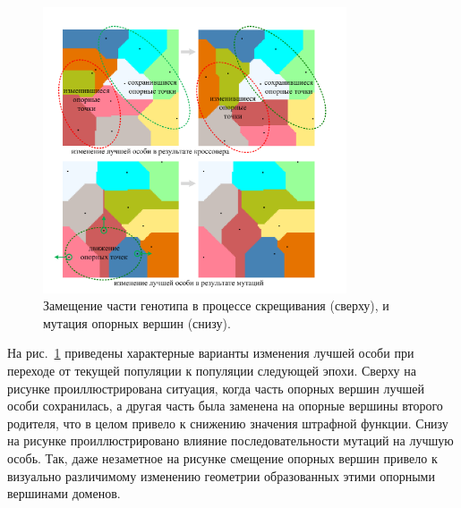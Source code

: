 \begin{figure}[ht]
\centering
\includegraphics[width=0.8\textwidth]{fig/par_gen_changes.pdf}
\singlespacing
{}\caption{Замещение части генотипа в процессе скрещивания (сверху), и мутация опорных вершин (снизу).}
\label{fig:text_2_genetic_changes}
\end{figure}

На рис.~\ref{fig:text_2_genetic_changes} приведены характерные варианты изменения лучшей особи при переходе от текущей популяции к популяции следующей эпохи.
Сверху на рисунке проиллюстрирована ситуация, когда часть опорных вершин лучшей особи сохранилась, а другая часть была заменена на опорные вершины второго родителя, что в целом привело к снижению значения штрафной функции.
Снизу на рисунке проиллюстрировано влияние последовательности мутаций на лучшую особь.
Так, даже незаметное на рисунке смещение опорных вершин привело к визуально различимому изменению геометрии образованных этими опорными вершинами доменов.


